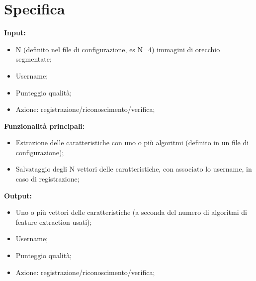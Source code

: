\chapter{Specifica}
\textbf{Input:}
\begin{itemize}
	\item N (definito nel file di configurazione, es N=4) immagini di orecchio segmentate;
	\item Username;
	\item Punteggio qualità;
	\item Azione: registrazione/riconoscimento/verifica;
\end{itemize}
\textbf{Funzionalità principali:}
\begin{itemize}
	\item Estrazione delle caratteristiche con uno o più algoritmi (definito in un file di configurazione);
	\item Salvataggio degli N vettori delle caratteristiche, con associato lo username, in caso di registrazione;
\end{itemize}
\textbf{Output:}
\begin{itemize}
	\item Uno o più vettori delle caratteristiche (a seconda del numero di algoritmi di feature extraction usati);
	\item Username;
	\item Punteggio qualità;
	\item Azione: registrazione/riconoscimento/verifica;
\end{itemize}